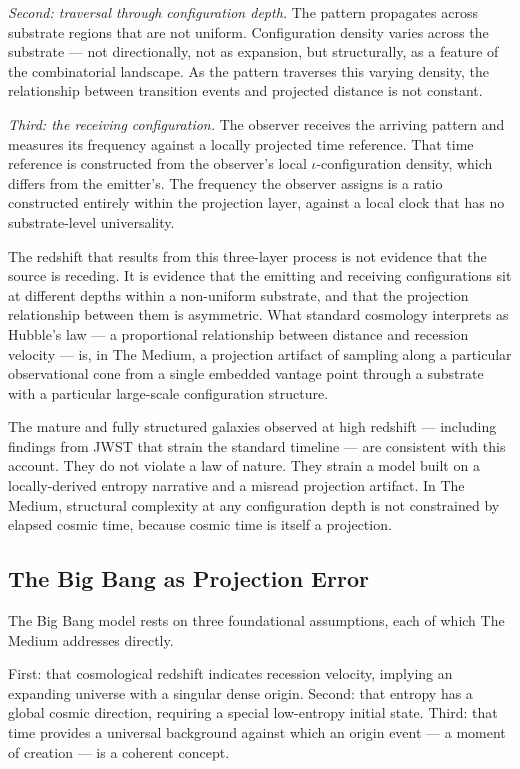 \documentclass[11pt,letterpaper]{article}
\begin{document}
\emph{Second: traversal through configuration depth.} The pattern propagates across substrate regions that are not uniform. Configuration density varies across the substrate --- not directionally, not as expansion, but structurally, as a feature of the combinatorial landscape. As the pattern traverses this varying density, the relationship between transition events and projected distance is not constant.

\emph{Third: the receiving configuration.} The observer receives the arriving pattern and measures its frequency against a locally projected time reference. That time reference is constructed from the observer's local \(\iota\)-configuration density, which differs from the emitter's. The frequency the observer assigns is a ratio constructed entirely within the projection layer, against a local clock that has no substrate-level universality.

The redshift that results from this three-layer process is not evidence that the source is receding. It is evidence that the emitting and receiving configurations sit at different depths within a non-uniform substrate, and that the projection relationship between them is asymmetric. What standard cosmology interprets as Hubble's law --- a proportional relationship between distance and recession velocity --- is, in The Medium, a projection artifact of sampling along a particular observational cone from a single embedded vantage point through a substrate with a particular large-scale configuration structure.

The mature and fully structured galaxies observed at high redshift --- including findings from JWST that strain the standard timeline --- are consistent with this account. They do not violate a law of nature. They strain a model built on a locally-derived entropy narrative and a misread projection artifact. In The Medium, structural complexity at any configuration depth is not constrained by elapsed cosmic time, because cosmic time is itself a projection.
\subsection{The Big Bang as Projection Error}
\label{sec:org30e2803}

The Big Bang model rests on three foundational assumptions, each of which The Medium addresses directly.

First: that cosmological redshift indicates recession velocity, implying an expanding universe with a singular dense origin. Second: that entropy has a global cosmic direction, requiring a special low-entropy initial state. Third: that time provides a universal background against which an origin event --- a moment of creation --- is a coherent concept.
\end{document}
